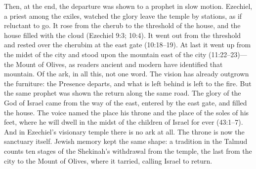 Then, at the end, the departure was shown to a prophet in slow motion.
Ezechiel, a priest among the exiles, watched the glory leave the
temple by stations, as if reluctant to go. It rose from the cherub to
the threshold of the house, and the house filled with the cloud
(Ezechiel 9:3; 10:4). It went out from the threshold and rested over
the cherubim at the east gate (10:18--19). At last it went up from the
midst of the city and stood upon the mountain east of the city
(11:22--23)---the Mount of Olives, as readers ancient and modern have
identified that mountain. Of the ark, in all this, not one word. The
vision has already outgrown the furniture: the Presence departs, and
what is left behind is left to the fire. But the same prophet was shown
the return along the same road. The glory of the God of Israel came
from the way of the east, entered by the east gate, and filled the
house. The voice named the place his throne and the place of the soles
of his feet, where he will dwell in the midst of the children of Israel
for ever (43:1--7). And in Ezechiel's visionary temple there is no ark
at all. The throne is now the sanctuary itself. Jewish memory kept the same shape: a tradition in
the Talmud counts ten stages of the Shekinah's withdrawal from the
temple, the last from the city to the Mount of Olives, where it
tarried, calling Israel to return.

